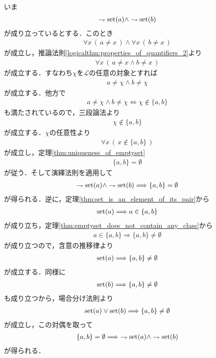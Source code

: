 	\begin{sketch}
		いま
		\begin{align}
			\rightharpoondown \operatorname*{set} (a) \wedge \rightharpoondown \operatorname*{set} (b)
		\end{align}
		が成り立っているとする．このとき
		\begin{align}
			\forall x\, (\, a \neq x\, ) \wedge \forall x\, (\, b \neq x\, )
		\end{align}
		が成立し，推論法則\ref{logicalthm:properties_of_quantifiers_2}より
		\begin{align}
			\forall x\, (\, a \neq x \wedge b \neq x\, )
		\end{align}
		が成立する．すなわち$\chi$を$\mathcal{L}$の任意の対象とすれば
		\begin{align}
			a \neq \chi \wedge b \neq \chi
		\end{align}
		が成立する．他方で
		\begin{align}
			a \neq \chi \wedge b \neq \chi \Longleftrightarrow \chi \notin \{a,b\}
		\end{align}
		も満たされているので，三段論法より
		\begin{align}
			\chi \notin \{a,b\}
		\end{align}
		が成立する．$\chi$の任意性より
		\begin{align}
			\forall x\, (\, x \notin \{a,b\}\, )
		\end{align}
		が成立し，定理\ref{thm:uniqueness_of_emptyset}
		\begin{align}
			\{a,b\} = \emptyset
		\end{align}
		が従う．そして演繹法則を適用して
		\begin{align}
			\rightharpoondown \operatorname*{set} (a) \wedge \rightharpoondown \operatorname*{set} (b) \Longrightarrow \{a,b\} = \emptyset
		\end{align}
		が得られる．逆に，定理\ref{thm:set_is_an_element_of_its_pair}から
		\begin{align}
			\operatorname*{set} (a) \Longrightarrow a \in \{a,b\}
		\end{align}
		が成り立ち，定理\ref{thm:emptyset_does_not_contain_any_class}から
		\begin{align}
			a \in \{a,b\} \Longrightarrow \{a,b\} \neq \emptyset
		\end{align}
		が成り立つので，含意の推移律より
		\begin{align}
			\operatorname*{set} (a) \Longrightarrow \{a,b\} \neq \emptyset
		\end{align}
		が成立する．同様に
		\begin{align}
			\operatorname*{set} (b) \Longrightarrow \{a,b\} \neq \emptyset
		\end{align}
		も成り立つから，場合分け法則より
		\begin{align}
			\operatorname*{set} (a) \vee \operatorname*{set} (b) \Longrightarrow \{a,b\} \neq \emptyset
		\end{align}
		が成立し，この対偶を取って
		\begin{align}
			\{a,b\} = \emptyset \Longrightarrow\ \rightharpoondown \operatorname*{set} (a) \wedge \rightharpoondown \operatorname*{set} (b)
		\end{align}
		が得られる．
		\QED
	\end{sketch}
	